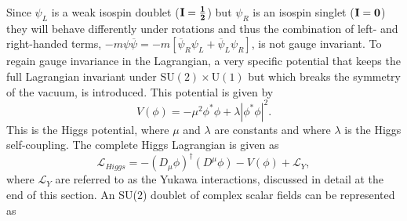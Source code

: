 








Since $\psi_{L}$ is a weak isospin doublet ($\bf{I}=\frac{1}{2}$) but $\psi_{R}$ is an isospin singlet ($\bf{I}=0$) they will behave differently under rotations and thus the combination of left- and right-handed terms, $-m\psi\overline{\psi} = -m[\overline{\psi}_{R}\psi_{L} + \overline{\psi}_{L}\psi_{R}]$, is not gauge invariant.
To regain gauge invariance in the Lagrangian, a very specific potential that keeps the full Lagrangian invariant under $\mathrm{SU(2)\times U(1)}$ but which breaks the symmetry of the vacuum, is introduced.
This potential is given by
\begin{equation}
  V(\phi) = -\mu^{2}\phi^{*}\phi +\lambda|\phi^{*}\phi|^{2}.
\end{equation}
This is the Higgs potential,  where $\mu$ and $\lambda$ are constants and where $\lambda$ is the Higgs self-coupling. The complete Higgs Lagrangian is given as 
\begin{equation}
  \mathcal{L}_{Higgs} = -(D_{\mu}\phi)^{\dagger}(D^{\mu}\phi) - V(\phi) + \mathcal{L}_{Y},
  \label{eq:higgs}
\end{equation}
where $\mathcal{L}_{Y}$ are referred to as the Yukawa interactions, discussed in detail at the end of this section. An SU(2) doublet of complex scalar fields can be represented as 
